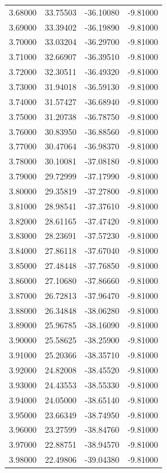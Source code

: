 \begin{table}
\begin{tabular}{llll}
3.68000 & 33.75503 & -36.10080 & -9.81000 \\
3.69000 & 33.39402 & -36.19890 & -9.81000 \\
3.70000 & 33.03204 & -36.29700 & -9.81000 \\
3.71000 & 32.66907 & -36.39510 & -9.81000 \\
3.72000 & 32.30511 & -36.49320 & -9.81000 \\
3.73000 & 31.94018 & -36.59130 & -9.81000 \\
3.74000 & 31.57427 & -36.68940 & -9.81000 \\
3.75000 & 31.20738 & -36.78750 & -9.81000 \\
3.76000 & 30.83950 & -36.88560 & -9.81000 \\
3.77000 & 30.47064 & -36.98370 & -9.81000 \\
3.78000 & 30.10081 & -37.08180 & -9.81000 \\
3.79000 & 29.72999 & -37.17990 & -9.81000 \\
3.80000 & 29.35819 & -37.27800 & -9.81000 \\
3.81000 & 28.98541 & -37.37610 & -9.81000 \\
3.82000 & 28.61165 & -37.47420 & -9.81000 \\
3.83000 & 28.23691 & -37.57230 & -9.81000 \\
3.84000 & 27.86118 & -37.67040 & -9.81000 \\
3.85000 & 27.48448 & -37.76850 & -9.81000 \\
3.86000 & 27.10680 & -37.86660 & -9.81000 \\
3.87000 & 26.72813 & -37.96470 & -9.81000 \\
3.88000 & 26.34848 & -38.06280 & -9.81000 \\
3.89000 & 25.96785 & -38.16090 & -9.81000 \\
3.90000 & 25.58625 & -38.25900 & -9.81000 \\
3.91000 & 25.20366 & -38.35710 & -9.81000 \\
3.92000 & 24.82008 & -38.45520 & -9.81000 \\
3.93000 & 24.43553 & -38.55330 & -9.81000 \\
3.94000 & 24.05000 & -38.65140 & -9.81000 \\
3.95000 & 23.66349 & -38.74950 & -9.81000 \\
3.96000 & 23.27599 & -38.84760 & -9.81000 \\
3.97000 & 22.88751 & -38.94570 & -9.81000 \\
3.98000 & 22.49806 & -39.04380 & -9.81000 \\

\end{tabular}
\end{table}
